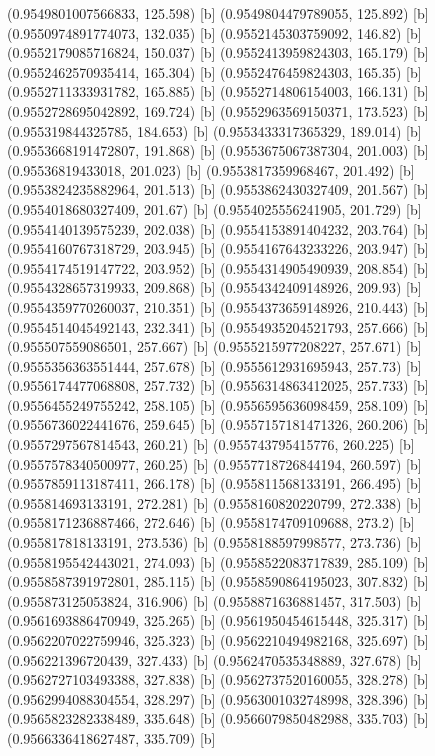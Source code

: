 {{{(0.9549801007566833, 125.598) [b] 
(0.9549804479789055, 125.892) [b] 
(0.9550974891774073, 132.035) [b] 
(0.9552145303759092, 146.82) [b] 
(0.9552179085716824, 150.037) [b] 
(0.9552413959824303, 165.179) [b] 
(0.9552462570935414, 165.304) [b] 
(0.9552476459824303, 165.35) [b] 
(0.9552711333931782, 165.885) [b] 
(0.9552714806154003, 166.131) [b] 
(0.9552728695042892, 169.724) [b] 
(0.9552963569150371, 173.523) [b] 
(0.955319844325785, 184.653) [b] 
(0.9553433317365329, 189.014) [b] 
(0.9553668191472807, 191.868) [b] 
(0.9553675067387304, 201.003) [b] 
(0.95536819433018, 201.023) [b] 
(0.9553817359968467, 201.492) [b] 
(0.9553824235882964, 201.513) [b] 
(0.9553862430327409, 201.567) [b] 
(0.9554018680327409, 201.67) [b] 
(0.9554025556241905, 201.729) [b] 
(0.9554140139575239, 202.038) [b] 
(0.9554153891404232, 203.764) [b] 
(0.9554160767318729, 203.945) [b] 
(0.9554167643233226, 203.947) [b] 
(0.9554174519147722, 203.952) [b] 
(0.9554314905490939, 208.854) [b] 
(0.9554328657319933, 209.868) [b] 
(0.9554342409148926, 209.93) [b] 
(0.9554359770260037, 210.351) [b] 
(0.9554373659148926, 210.443) [b] 
(0.9554514045492143, 232.341) [b] 
(0.9554935204521793, 257.666) [b] 
(0.955507559086501, 257.667) [b] 
(0.9555215977208227, 257.671) [b] 
(0.9555356363551444, 257.678) [b] 
(0.9555612931695943, 257.73) [b] 
(0.9556174477068808, 257.732) [b] 
(0.9556314863412025, 257.733) [b] 
(0.9556455249755242, 258.105) [b] 
(0.9556595636098459, 258.109) [b] 
(0.9556736022441676, 259.645) [b] 
(0.9557157181471326, 260.206) [b] 
(0.9557297567814543, 260.21) [b] 
(0.955743795415776, 260.225) [b] 
(0.9557578340500977, 260.25) [b] 
(0.9557718726844194, 260.597) [b] 
(0.9557859113187411, 266.178) [b] 
(0.955811568133191, 266.495) [b] 
(0.955814693133191, 272.281) [b] 
(0.9558160820220799, 272.338) [b] 
(0.9558171236887466, 272.646) [b] 
(0.9558174709109688, 273.2) [b] 
(0.955817818133191, 273.536) [b] 
(0.9558188597998577, 273.736) [b] 
(0.9558195542443021, 274.093) [b] 
(0.9558522083717839, 285.109) [b] 
(0.9558587391972801, 285.115) [b] 
(0.9558590864195023, 307.832) [b] 
(0.955873125053824, 316.906) [b] 
(0.9558871636881457, 317.503) [b] 
(0.9561693886470949, 325.265) [b] 
(0.9561950454615448, 325.317) [b] 
(0.9562207022759946, 325.323) [b] 
(0.9562210494982168, 325.697) [b] 
(0.956221396720439, 327.433) [b] 
(0.9562470535348889, 327.678) [b] 
(0.9562727103493388, 327.838) [b] 
(0.9562737520160055, 328.278) [b] 
(0.9562994088304554, 328.297) [b] 
(0.9563001032748998, 328.396) [b] 
(0.9565823282338489, 335.648) [b] 
(0.9566079850482988, 335.703) [b] 
(0.9566336418627487, 335.709) [b] 
}}}
